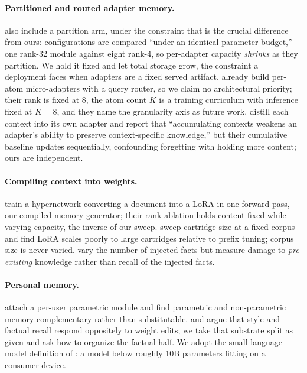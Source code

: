 \documentclass{article}
\begin{document}
\paragraph{Partitioned and routed adapter memory.} \citet{loramem} also include a
partition arm, under the constraint that is the crucial difference from ours:
configurations are compared ``under an identical parameter budget,'' one rank-32
module against eight rank-4, so per-adapter capacity \emph{shrinks} as they
partition. We hold it fixed and let total storage grow, the constraint a
deployment faces when adapters are a fixed served artifact. \citet{d2a} already
build per-atom micro-adapters with a query router, so we claim no architectural
priority; their rank is fixed at 8, the atom count $K$ is a training curriculum
with inference fixed at $K=8$, and they name the granularity axis as future work.
\citet{cdlmm} distill each context into its own adapter and report that
``accumulating contexts weakens an adapter's ability to preserve context-specific
knowledge,'' but their cumulative baseline updates sequentially, confounding
forgetting with holding more content; ours are independent.

\paragraph{Compiling context into weights.} \citet{d2l} train a hypernetwork
converting a document into a LoRA in one forward pass, our compiled-memory
generator; their rank ablation holds content fixed while varying capacity, the
inverse of our sweep. \citet{cartridges} sweep cartridge size at a fixed corpus
and find LoRA scales poorly to large cartridges relative to prefix tuning; corpus
size is never varied. \citet{packlora} vary the number of injected facts but
measure damage to \emph{pre-existing} knowledge rather than recall of the injected
facts.

\paragraph{Personal memory.} \citet{oppu} attach a per-user parametric module
and find parametric and non-parametric memory complementary rather than
substitutable. \citet{substrate} and \citet{engram} argue that style and factual
recall respond oppositely to weight edits; we take that substrate split as given
and ask how to organize the factual half. We adopt the small-language-model
definition of \citet{slm}: a model below roughly 10B parameters fitting on a
consumer device.
\end{document}
